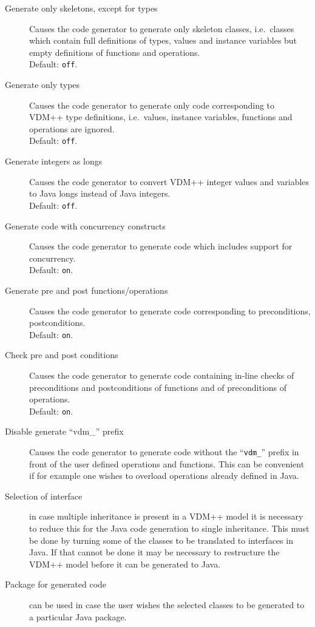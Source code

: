 \documentclass[\pformat,12pt]{article}
\begin{document}
\begin{description}
\item[Generate only skeletons, except for types] Causes the code
  generator to generate only skeleton classes, i.e.\ classes which
  contain full definitions of types, values and instance variables but
  empty definitions of functions and operations. \\
  Default: \texttt{off}.
\item[Generate only types] Causes the code generator to generate only
  code corresponding to VDM++ type definitions, i.e.\ values, instance
  variables, functions and operations are ignored. \\
  Default: \texttt{off}.
\item[Generate integers as longs] Causes the code generator to convert
  VDM++ integer values and variables to Java longs instead of Java
  integers. \\
  Default: \texttt{off}.
\item[Generate code with concurrency constructs] Causes the code
  generator to generate code which includes support for concurrency. \\
  Default: \texttt{on}.
\item[Generate pre and post functions/operations] Causes the code
  generator to generate code corresponding to preconditions,
  postconditions. \\
  Default: \texttt{on}.
\item[Check pre and post conditions] Causes the code
  generator to generate code containing in-line checks of
  preconditions and postconditions of functions and of preconditions
  of operations. \\
  Default: \texttt{on}.
\item[Disable generate ``vdm\_'' prefix] Causes the code
  generator to generate code without the ``\texttt{vdm\_}'' prefix in
  front of the user defined operations and functions. This can be
  convenient if for example one wishes to overload operations already
  defined in Java.
\item[Selection of interface] in case multiple inheritance is present in
  a VDM++ model it is necessary to reduce this for the Java code
  generation to single inheritance. This must be done by turning some
  of the classes to be translated to interfaces in Java. If that
  cannot be done it may be necessary to restructure the VDM++ model
  before it can be generated to Java.
\item[Package for generated code] can be used in case the user wishes
  the selected classes to be generated to a particular Java package.

\end{description}
\end{document}
